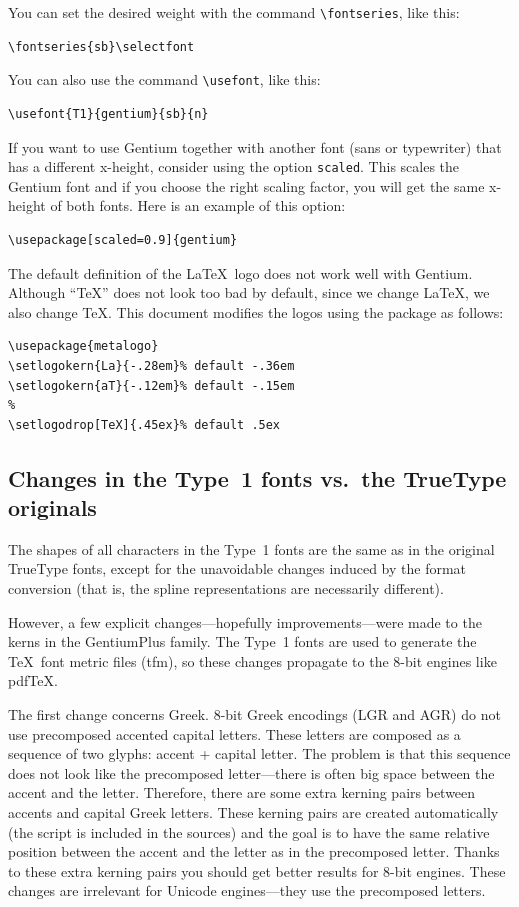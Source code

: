 \documentclass[12pt, english]{article}
\def\pdfTeX{pdf{\TeX}}
\begin{document}
You can set the desired weight with the command \verb|\fontseries|, like this:
\begin{verbatim}
\fontseries{sb}\selectfont
\end{verbatim}

You can also use the command \verb|\usefont|, like this:
\begin{verbatim}
\usefont{T1}{gentium}{sb}{n}
\end{verbatim}

If you want to use Gentium together with another font (sans or
typewriter) that has a different \mbox{x-height}, consider using the
option \verb|scaled|. This scales the Gentium font and if you choose the
right scaling factor, you will get the same x-height of both fonts. Here
is an example of this option:
\begin{verbatim}
\usepackage[scaled=0.9]{gentium}
\end{verbatim}

The default definition of the \LaTeX\ logo does not work well with
Gentium. Although ``\TeX'' does not look too bad by default, since we
change \LaTeX, we also change \TeX. This document modifies the logos
using the  package as follows:

\begin{verbatim}
\usepackage{metalogo}
\setlogokern{La}{-.28em}% default -.36em
\setlogokern{aT}{-.12em}% default -.15em
%
\setlogodrop[TeX]{.45ex}% default .5ex
\end{verbatim}


\subsection{Changes in the Type~1 fonts vs.\ the TrueType originals}

The shapes of all characters in the Type~1 fonts are the same as in the
original TrueType fonts, except for the unavoidable changes induced
by the format conversion (that is, the spline representations are
necessarily different).

However, a few explicit changes---hopefully improvements---were made to the
kerns in the GentiumPlus family. The Type~1 fonts are used to generate
the \TeX\ font metric files (tfm), so these changes propagate to the
8-bit engines like \pdfTeX.

The first change concerns Greek.  8-bit Greek encodings (LGR and AGR) do
not use precomposed accented capital letters. These letters are composed
as a sequence of two glyphs: accent + capital letter. The problem is
that this sequence does not look like the precomposed letter---there is
often big space between the accent and the letter. Therefore, there are
some extra kerning pairs between accents and capital Greek
letters. These kerning pairs are created automatically (the script is
included in the sources) and the goal is to have the same relative
position between the accent and the letter as in the precomposed
letter. Thanks to these extra kerning pairs you should get better
results for 8-bit engines. These changes are irrelevant for Unicode
engines---they use the precomposed letters.
\end{document}
